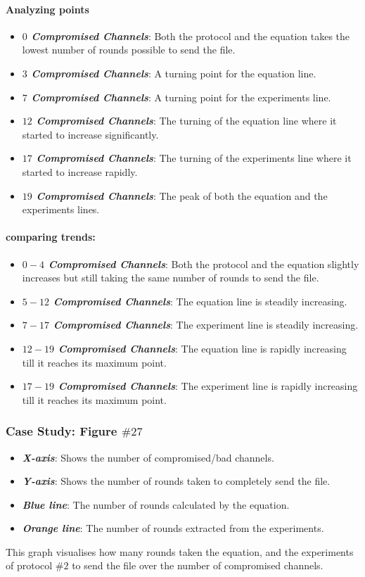 \documentclass[main.tex]{subfiles}
\begin{document}
\paragraph{Analyzing points}
\begin{itemize}
\item \textbf{\textit{$0$ Compromised Channels}}: Both the protocol and the equation takes the lowest number of rounds possible to send the file.
\item \textbf{\textit{$3$ Compromised Channels}}: A turning point for the equation line.
\item \textbf{\textit{$7$ Compromised Channels}}: A turning point for the experiments line.
\item \textbf{\textit{$12$ Compromised Channels}}: The turning of the equation line where it started to increase significantly.
\item \textbf{\textit{$17$ Compromised Channels}}: The turning of the experiments line where it started to increase rapidly.  
\item \textbf{\textit{$19$ Compromised Channels}}: The peak of both the equation and the experiments lines.  
\end{itemize}
\paragraph{comparing trends:}
\begin{itemize}
\item \textbf{\textit{$0-4$ Compromised Channels}}: Both the protocol and the equation slightly increases but still taking the same number of rounds to send the file.
\item \textbf{\textit{$5-12$ Compromised Channels}}: The equation line is steadily increasing.
\item \textbf{\textit{$7-17$ Compromised Channels}}: The experiment line is steadily increasing.
\item \textbf{\textit{$12-19$ Compromised Channels}}: The equation line is rapidly increasing till it reaches its maximum point.
\item \textbf{\textit{$17-19$ Compromised Channels}}: The experiment line is rapidly increasing till it reaches its maximum point.
\end{itemize}

\subsubsection{Case Study: Figure $\#27$}
\begin{itemize}
\item \textbf{\textit{X-axis}}: Shows the number of compromised/bad channels.
\item \textbf{\textit{Y-axis}}: Shows the number of rounds taken to completely send the file.
\item \textbf{\textit{Blue line}}: The number of rounds calculated by the equation.
\item \textbf{\textit{Orange line}}: The number of rounds extracted from the experiments.
\end{itemize}
This graph visualises how many rounds taken the equation, and the experiments of protocol $\#2$ to send the file over the number of compromised channels.
\end{document}
